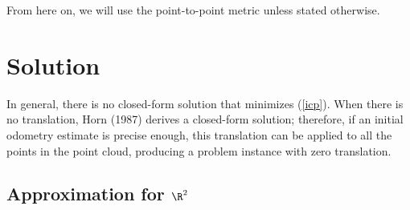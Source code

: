 \documentclass[12pt]{article}
\theoremstyle{defstyle}
\begin{document}
From here on, we will use the point-to-point metric unless stated otherwise.

\section{Solution}

In general, there is no closed-form solution that minimizes (\ref{icp}).
When there is no translation, Horn (1987) derives a closed-form solution; therefore, if an initial odometry estimate is precise enough, this translation can be applied to all the points in the point cloud, producing a problem instance with zero translation.

\subsection{Approximation for $\R^2$}
\end{document}
